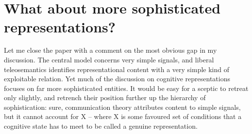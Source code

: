 \documentclass[12pt]{article}
\begin{document}
\section{What about more sophisticated representations?}\label{sec:sophisticated}

Let me close the paper with a comment on the most obvious gap in my discussion.
The central model concerns very simple signals, and liberal teleosemantics identifies representational content with a very simple kind of exploitable relation. 
Yet much of the discussion on cognitive representations focuses on far more sophisticated entities.
It would be easy for a sceptic to retreat only slightly, and retrench their position further up the hierarchy of sophistication: sure, communication theory attributes content to simple signals, but it cannot account for X -- where X is some favoured set of conditions that a cognitive state has to meet to be called a genuine representation.
\end{document}
